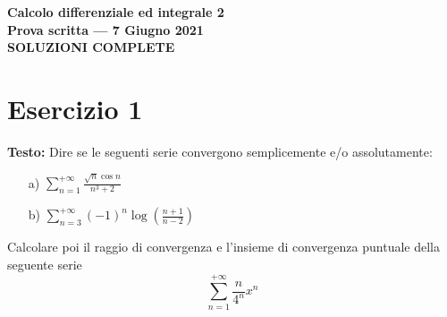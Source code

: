\documentclass[12pt, a4paper]{article}
\begin{document}
\begin{center}
\Large\textbf{Calcolo differenziale ed integrale 2}\\
\large\textbf{Prova scritta --- 7 Giugno 2021}\\
\large\textbf{SOLUZIONI COMPLETE}
\end{center}

\vspace{1cm}

\section*{Esercizio 1}

\textbf{Testo:} Dire se le seguenti serie convergono semplicemente e/o assolutamente:
\begin{enumerate}
    \item[a)] $\displaystyle\sum_{n=1}^{+\infty} \frac{\sqrt{n}\cos n}{n^{3}+2}$
    \item[b)] $\displaystyle\sum_{n=3}^{+\infty} (-1)^{n} \log\left(\frac{n+1}{n-2}\right)$
\end{enumerate}
Calcolare poi il raggio di convergenza e l'insieme di convergenza puntuale della seguente serie
\[ \sum_{n=1}^{+\infty} \frac{n}{4^{n}}x^{n} \]
\end{document}
